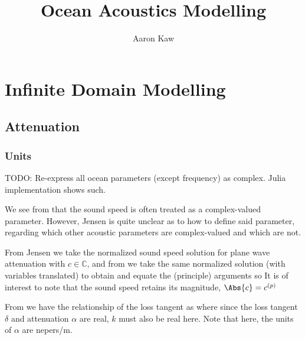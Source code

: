 \documentclass{report}
\title{Ocean Acoustics Modelling}
\author{Aaron Kaw}
\date{}
\newcommand{\bbC}{\mathbb{C}}
\begin{document}
\maketitle
\tableofcontents

\chapter{Infinite Domain Modelling}
\section{Attenuation}
\subsection{Units}
TODO: Re-express all ocean parameters (except frequency) as complex. Julia implementation shows such.

We see from \cite{jensen2011computational} that the sound speed is often treated as a complex-valued parameter. However, Jensen is quite unclear as to how to define said parameter, regarding which other acoustic parameters are complex-valued and which are not.

From Jensen we take the normalized sound speed solution for plane wave attenuation
with $c \in \bbC$, and from \cite{buckingham1997theory} we take the same normalized solution (with variables translated) to obtain
and equate the (principle) arguments so
It is of interest to note that the sound speed retains its magnitude, $\Abs{c} = c^{(p)}$

From \cite{jensen2011computational} we have the relationship of the loss tangent as
where since the loss tangent $\delta$ and attenuation $\alpha$ are real, $k$ must also be real here. Note that here, the units of $\alpha$ are nepers/m.
\end{document}

